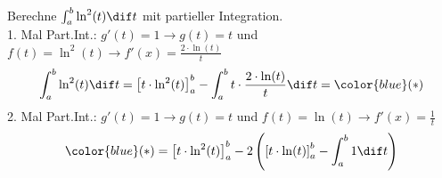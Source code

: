 \begin{example}
    Berechne $\int_a^b \ln^2(t) \dif t$ mit partieller Integration.\\
    1. Mal Part.Int.: $g'(t) = 1 \rightarrow g(t) = t$ und $
            f(t) = \ln^2 (t) \rightarrow  f'(x) = \frac{2 \cdot \ln(t)}{t}$
    \begin{gather*}
        \int_a^b \ln^2(t) \dif t = \left[t \cdot \ln^2(t)\right]_a^b - \int_a^b t \cdot \frac{2 \cdot \ln(t)}{t} \dif t = {\color{blue}(*)}
    \end{gather*}
    2. Mal Part.Int.: $g'(t) = 1 \rightarrow g(t) = t$ und $
            f(t) = \ln (t) \rightarrow f'(x) = \frac{1}{t}$
    \begin{gather*}
        {\color{blue}(*)} = \left[t \cdot \ln^2(t)\right]_a^b - 2 \left(\left[t \cdot \ln (t)\right]_a^b - \int_a^b 1 \dif t\right)
    \end{gather*}
\end{example}
